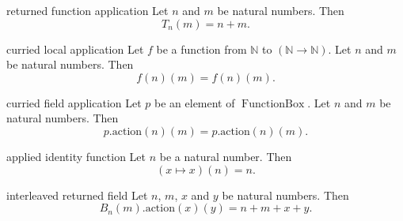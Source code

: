 \begin{cleanresult}{returned function application}
Let $n$ and $m$ be natural numbers.
Then \[T_{n}(m) = n + m.\]
\end{cleanresult}

\begin{cleanresult}{curried local application}
Let $f$ be a function from $\mathbb{N}$ to $(\mathbb{N}\to \mathbb{N})$.
Let $n$ and $m$ be natural numbers.
Then \[f(n)(m) = f(n)(m).\]
\end{cleanresult}

\begin{cleanresult}{curried field application}
Let $p$ be an element of $\operatorname{FunctionBox}$.
Let $n$ and $m$ be natural numbers.
Then \[p.\mathrm{action}(n)(m) = p.\mathrm{action}(n)(m).\]
\end{cleanresult}

\begin{cleanresult}{applied identity function}
Let $n$ be a natural number.
Then \[\left(x \mapsto x\right)(n) = n.\]
\end{cleanresult}

\begin{cleanresult}{interleaved returned field}
Let $n$, $m$, $x$ and $y$ be natural numbers.
Then \[B_{n}(m).\mathrm{action}(x)(y) = n + m + x + y.\]
\end{cleanresult}

